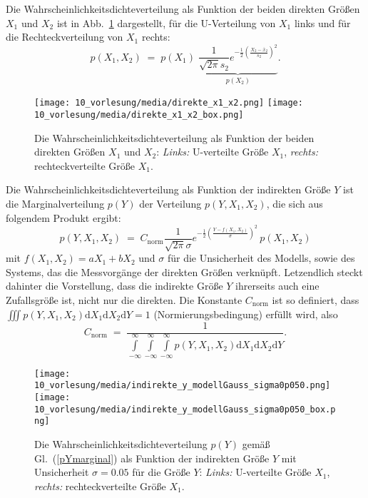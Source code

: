 Die Wahrscheinlichkeitsdichteverteilung als Funktion der beiden direkten Größen $X_1$
und $X_2$ ist in Abb.~\ref{pdfx1x2} dargestellt, für die U-Verteilung von $X_1$ links
und für die Rechteckverteilung von $X_1$ rechts:
\begin{equation}
p(X_1, X_2) \; = \; p(X_1) \; \underbrace{\frac{1}{\sqrt{2\pi} s_2}
	e^{-\frac{1}{2}\left(\frac{X_2 - \bar x_2}{s_2}\right)^2} }_{p(X_2)}.
\end{equation}
\begin{figure}
	\begin{center}
		\texttt{[image: 10\_vorlesung/media/direkte\_x1\_x2.png]}
		\hspace{2mm}
		\texttt{[image: 10\_vorlesung/media/direkte\_x1\_x2\_box.png]}
		\caption{Die Wahrscheinlichkeitsdichteverteilung als Funktion der beiden direkten Größen $X_1$
			und $X_2$: \textsl{Links:} U-verteilte Größe $X_1$,
			\textsl{rechts:} rechteckverteilte Größe $X_1$.}
		\label{pdfx1x2}
	\end{center}
\end{figure}

Die Wahrscheinlichkeitsdichteverteilung als Funktion der indirekten Größe $Y$ ist
die Marginalverteilung $p(Y)$ der Verteilung $p(Y,X_1,X_2)$, die sich aus folgendem Produkt ergibt:
\begin{equation}
p(Y,X_1,X_2) \; = \; C_\mathrm{norm}
\frac{1}{\sqrt{2\pi} \sigma} e^{-\frac{1}{2}\left(\frac{Y - f(X_1, X_2)}{\sigma}\right)^2}
\, p(X_1,X_2)
\end{equation}
mit $f(X_1, X_2) = a X_1 + b X_2$ und $\sigma$ für die Unsicherheit des Modells, sowie des
Systems, das die Messvorgänge der direkten Größen verknüpft. Letzendlich steckt dahinter
die Vorstellung, dass die indirekte Größe $Y$ ihrerseits auch eine Zufallsgröße ist, nicht nur
die direkten. Die Konstante $C_\mathrm{norm}$ ist so definiert, dass
$\iiint p(Y,X_1,X_2) \mathrm{d}X_1 \mathrm{d}X_2 \mathrm{d}Y = 1$ (Normierungsbedingung) erfüllt wird, also
\begin{equation}
C_\mathrm{norm} \; = \; \frac{1}{\int\limits_{-\infty}^{\infty} \int\limits_{-\infty}^{\infty}
	\int\limits_{-\infty}^{\infty} p(Y,X_1,X_2) \mathrm{d}X_1 \mathrm{d}X_2 \mathrm{d}Y } .
\end{equation}

\begin{figure}
	\begin{center}
	\texttt{[image: 10\_vorlesung/media/indirekte\_y\_modellGauss\_sigma0p050.png]}
		\hspace{2mm}
	\texttt{[image: 10\_vorlesung/media/indirekte\_y\_modellGauss\_sigma0p050\_box.png]}
		\caption{Die Wahrscheinlichkeitsdichteverteilung $p(Y)$ gemäß Gl.~(\ref{pYmarginal}) als Funktion der
			indirekten Größe $Y$ mit Unsicherheit $\sigma = 0.05$ für die Größe $Y$:
			\textsl{Links:} U-verteilte Größe $X_1$,
			\textsl{rechts:} rechteckverteilte Größe $X_1$.}
		\label{pdfYsigma}
	\end{center}
\end{figure}

